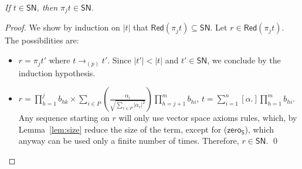 \documentclass[preprint]{elsarticle}
\newcommand\Red[1]{\mathsf{Red}(#1)}
\newcommand\SN{\mathsf{SN}}
\newcommand\lpl[1]{|#1|}
\newcommand\recap[3]{\noindent {\bf #1 \ref{#2}.} \emph{#3}}
\newcommand\lra[1][1]{\longrightarrow_{\left(#1\right)}}
\newcommand\lrap{\lra[p]}
\newcommand\s[1]{\ensuremath{\mathsf{#1}}}
\newcommand\may[1][\alpha]{[{#1}.]}
\newcommand\rzeroS{(\s{zero_S})}
\begin{document}
\recap{Lemma}{lem:t_implies_proj_t}{
  If \( t \in \SN \), then \( \pi_{j}{t} \in \SN \).
}
\begin{proof}
  We show by induction on $|t|$ that $\Red{\pi_{j}{t}}\subseteq\SN$.
  Let $r\in\Red{\pi_jt}$. The possibilities are:
  \begin{itemize}
  \item \( r=\pi_{j}{t'} \) where \( t \lrap t' \). Since \( \lpl{t'} < \lpl{t} \)
    and \( t' \in \SN \), we conclude by the induction hypothesis.
  \item \( r = \prod_{h = 1}^j b_{hk} \times \sum_{i \in P}
    \left(\frac{\alpha_i}{\sqrt{\sum_{r \in P} |\alpha_r|^2}}\right)
    \prod_{h=j+1}^m b_{hi}\), $t=\sum_{i=1}^n\may\prod_{h=1}^m b_{hi}$.
    Any sequence starting on $r$ will only use vector space axioms rules, which,
    by Lemma~\ref{lem:size} reduce the size of the term, except for
    \rzeroS, which anyway can be used only a finite number of times. Therefore, $r\in\SN$.
    \qed
  \end{itemize}
\end{proof}
\end{document}
